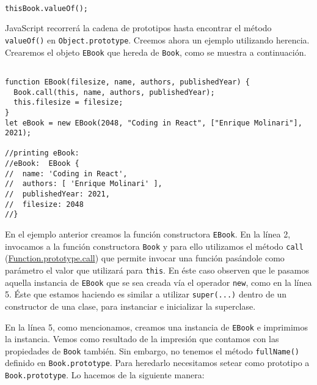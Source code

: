 \documentclass[a4paper, oneside, titlepage, 12pt]{paper}
\begin{document}
\begin{verbatim}

thisBook.valueOf();
\end{verbatim}

JavaScript recorrerá la cadena de prototipos hasta encontrar el método \texttt{valueOf()} en \texttt{Object.prototype}. Creemos ahora un ejemplo utilizando herencia. Crearemos el objeto \texttt{EBook} que hereda de \texttt{Book}, como se muestra a continuación.

\begin{verbatim}

function EBook(filesize, name, authors, publishedYear) {
  Book.call(this, name, authors, publishedYear);
  this.filesize = filesize;
}
let eBook = new EBook(2048, "Coding in React", ["Enrique Molinari"], 2021);

//printing eBook:
//eBook:  EBook {
//  name: 'Coding in React',
//  authors: [ 'Enrique Molinari' ],
//  publishedYear: 2021,
//  filesize: 2048
//}
\end{verbatim}

En el ejemplo anterior creamos la función constructora \texttt{EBook}. En la línea 2, invocamos a la función constructora \texttt{Book} y para ello utilizamos el método \texttt{call} (\href{https://developer.mozilla.org/es/docs/Web/JavaScript/Reference/Global_Objects/Function/call}{Function.prototype.call}) que permite invocar una función pasándole como parámetro el valor que utilizará para \texttt{this}. En éste caso observen que le pasamos aquella instancia de \texttt{EBook} que se sea creada vía el operador \texttt{new}, como en la línea 5. Éste que estamos haciendo es similar a utilizar \texttt{super(...)} dentro de un constructor de una clase, para instanciar e inicializar la superclase. 
\newline

En la línea 5, como mencionamos, creamos una instancia de \texttt{EBook} e imprimimos la instancia. Vemos como resultado de la impresión que contamos con las propiedades de \texttt{Book} también. Sin embargo, no tenemos el método \texttt{fullName()} definido en \texttt{Book.prototype}. Para heredarlo necesitamos setear como prototipo a \texttt{Book.prototype}. Lo hacemos de la siguiente manera:
\end{document}
